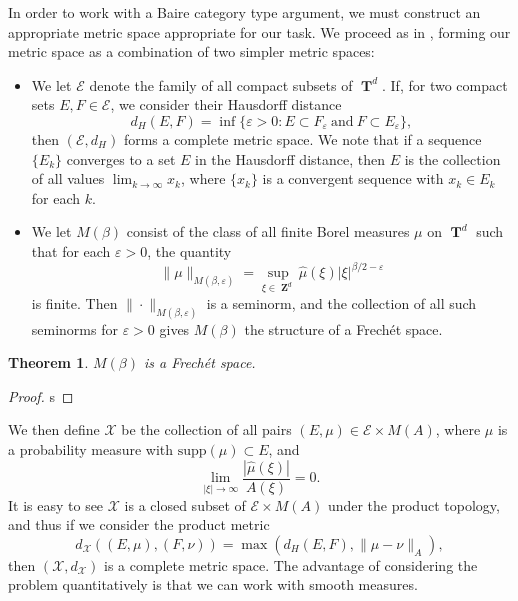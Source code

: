 \documentclass[12pt,reqno]{article}
\numberwithin{equation}{section}
\DeclareMathOperator{\ZZ}{\mathbf{Z}}
\DeclareMathOperator{\TT}{\mathbf{T}}
\newtheorem{theorem}{Theorem}
\begin{document}
In order to work with a Baire category type argument, we must construct an appropriate metric space appropriate for our task. We proceed as in \cite{Korner2}, forming our metric space as a combination of two simpler metric spaces:
%
\begin{itemize}
    \item We let $\mathcal{E}$ denote the family of all compact subsets of $\TT^d$. If, for two compact sets $E,F \in \mathcal{E}$, we consider their Hausdorff distance
    \[ d_H(E,F) = \inf \{ \varepsilon > 0 : E \subset F_\varepsilon\ \text{and}\ F \subset E_\varepsilon \}, \]
    then $(\mathcal{E},d_H)$ forms a complete metric space. We note that if a sequence $\{ E_k \}$ converges to a set $E$ in the Hausdorff distance, then $E$ is the collection of all values $\lim_{k \to \infty} x_k$, where $\{ x_k \}$ is a convergent sequence with $x_k \in E_k$ for each $k$.

    \item We let $M(\beta)$ consist of the class of all finite Borel measures $\mu$ on $\TT^d$ such that for each $\varepsilon > 0$, the quantity
    \[ \| \mu \|_{M(\beta,\varepsilon)} = \sup_{\xi \in \ZZ^d} \widehat{\mu}(\xi) |\xi|^{\beta/2 - \varepsilon} \]
    is finite. Then $\| \cdot \|_{M(\beta,\varepsilon)}$ is a seminorm, and the collection of all such seminorms for $\varepsilon > 0$ gives $M(\beta)$ the structure of a Frech\'{e}t space.
\end{itemize}

\begin{theorem}
    $M(\beta)$ is a Frech\'{e}t space.
\end{theorem}
\begin{proof}
    s
\end{proof}

We then define $\mathcal{X}$ be the collection of all pairs $(E,\mu) \in \mathcal{E} \times M(A)$, where $\mu$ is a probability measure with $\text{supp}(\mu) \subset E$, and
%
\[ \lim_{|\xi| \to \infty} \frac{|\widehat{\mu}(\xi)|}{A(\xi)} = 0. \]
%
It is easy to see $\mathcal{X}$ is a closed subset of $\mathcal{E} \times M(A)$ under the product topology, and thus if we consider the product metric
%
\[ d_{\mathcal{X}}((E,\mu),(F,\nu)) = \max \left( d_H(E,F), \| \mu - \nu \|_A \right), \]
%
then $(\mathcal{X},d_\mathcal{X})$ is a complete metric space. The advantage of considering the problem quantitatively is that we can work with smooth measures.
\end{document}
